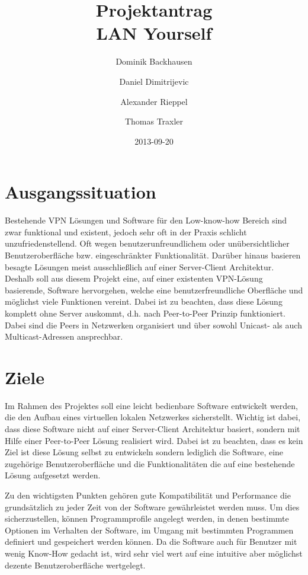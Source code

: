 \documentclass[a4paper,12pt]{scrreprt}
\begin{document}
\author{Dominik Backhausen\and Daniel Dimitrijevic\and Alexander Rieppel\and Thomas Traxler}
\title{Projektantrag\\ LAN Yourself}
\date{2013-09-20}
\maketitle

\section*{Ausgangssituation}
Bestehende VPN Lösungen und Software für den Low-know-how Bereich sind zwar funktional und existent, jedoch sehr oft in der Praxis schlicht unzufriedenstellend. Oft wegen benutzerunfreundlichem oder unübersichtlicher Benutzeroberfläche bzw. eingeschränkter Funktionalität. Darüber hinaus basieren besagte Lösungen meist ausschließlich auf einer Server-Client Architektur. Deshalb soll aus diesem Projekt eine, auf einer existenten VPN-Lösung basierende, Software hervorgehen, welche eine benutzerfreundliche Oberfläche und möglichst viele Funktionen vereint. Dabei ist zu beachten, dass diese Lösung komplett ohne Server auskommt, d.h. nach Peer-to-Peer Prinzip funktioniert. Dabei sind die Peers in Netzwerken organisiert und über sowohl Unicast- als auch Multicast-Adressen ansprechbar.



\section*{Ziele}

	Im Rahmen des Projektes soll eine leicht bedienbare Software entwickelt werden, die den Aufbau eines virtuellen lokalen Netzwerkes sicherstellt. Wichtig ist dabei, dass diese Software nicht auf einer Server-Client Architektur basiert, sondern mit Hilfe einer Peer-to-Peer Lösung realisiert wird. Dabei ist zu beachten, dass es kein Ziel ist diese Lösung selbst zu entwickeln sondern lediglich die Software, eine zugehörige Benutzeroberfläche und die Funktionalitäten die auf eine bestehende Lösung aufgesetzt werden.
	
	Zu den wichtigsten Punkten gehören gute Kompatibilität und Performance die grundsätzlich zu jeder Zeit von der Software gewährleistet werden muss. Um dies sicherzustellen, können Programmprofile angelegt werden, in denen bestimmte Optionen im Verhalten der Software, im Umgang mit bestimmten Programmen definiert und gespeichert werden können. Da die Software auch für Benutzer mit wenig Know-How gedacht ist, wird sehr viel wert auf eine intuitive aber möglichst dezente Benutzeroberfläche wertgelegt. 
	
\end{document}
